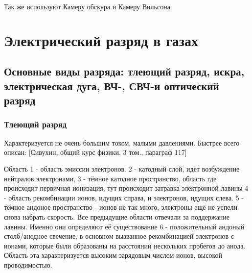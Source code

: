 \documentclass[10pt, a4paper]{article}
\numberwithin{equation}{section}
\begin{document}
\begin{figure}[h!]
\end{figure}

Так же используют Камеру обскура и Камеру Вильсона.

\section{Электрический разряд в газах}

\subsection{Основные виды разряда: тлеющий разряд, искра, электрическая дуга, ВЧ-, СВЧ-и оптический разряд}
\subsubsection{Тлеющий разряд}
Характеризуется не очень большим током, малыми давлениями.
Быстрее всего описан: [Сивухин, общий курс физики, 3 том., параграф 117]
\begin{figure}[h!]
\end{figure}
Область 1 - область эмиссии электронов. 2 - катодный слой, идёт возбуждение нейтралов электронами, 3 - тёмное катодное пространство, область где происходит первичная ионизация, тут происходит затравка электронной лавины 4 - область рекомбинации ионов, идущих справа, и электронов, идущих слева. 5 - тёмное андоное пространство - ионов не так много, электроны ещё не успели снова набрать скорость. Все предыдущие области отвечали за поддержание лавины. Именно они определяют её существование  6 - положительный андоный столб/анодное свечение, в основном вызванное рекомбинацией электронов с ионами, которые были образованы на расстоянии нескольких пробегов до анода. Область эта характеризуется высоким зарядовым числом ионов, высокой проводимостью.
\end{document}
